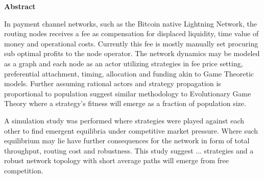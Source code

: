 \centering \textbf{Abstract}

In payment channel networks, such as the Bitcoin native Lightning Network, the routing nodes receives a fee as compensation for displaced liquidity, time value of money and operational costs. Currently this fee is mostly manually set procuring sub optimal profits to the node operator. The network dynamics may be modeled as a graph and each node as an actor utilizing strategies in fee price setting, preferential attachment, timing, allocation and funding akin to Game Theoretic models. Further assuming rational actors and strategy propagation is proportional to population suggest similar methodology to Evolutionary Game Theory where a strategy's fitness will emerge as a fraction of population size. 

A simulation study was performed where strategies were played against each other to find emergent equilibria under competitive market pressure. Where such equilibrium may lie have further consequences for the network in form of total throughput, routing cost and robustness. This study suggest ... strategies and a robust network topology with short average paths will emerge from free competition.

